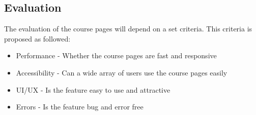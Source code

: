 \subsection{Evaluation}
The evaluation of the course pages will depend on a set criteria.
This criteria is proposed as followed:
\begin{itemize}
    \item Performance - Whether the course pages are fast and responsive
    \item Accessibility - Can a wide array of users use the course pages easily
    \item UI/UX - Is the feature easy to use and attractive
    \item Errors - Is the feature bug and error free
\end{itemize}

